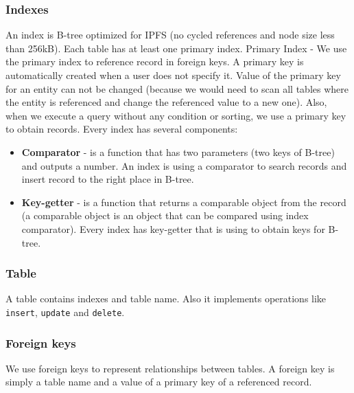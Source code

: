 \subsubsection{Indexes}
An index is B-tree optimized for IPFS (no cycled references and node size less than 256kB). Each table has at least one primary index. Primary Index - We use the primary index to reference record in foreign keys. A primary key is automatically created when a user does not specify it. Value of the primary key for an entity can not be changed (because we would need to scan all tables where the entity is referenced and change the referenced value to a new one). Also, when we execute a query without any condition or sorting, we use a primary key to obtain records. Every index has several components: 
\begin{itemize}
    \item \textbf{Comparator} - is a function that has two parameters (two keys of B-tree) and outputs a number. An index is using a comparator to search records and insert record to the right place in B-tree.
    \item \textbf{Key-getter} - is a function that returns a comparable object from the record (a comparable object is an object that can be compared using index comparator). Every index has key-getter that is using to obtain keys for B-tree.
\end{itemize}

\subsubsection{Table}
A table contains indexes and table name. Also it implements operations like \texttt{insert}, \texttt{update} and \texttt{delete}.

\subsubsection{Foreign keys}
We use foreign keys to represent relationships between tables. A foreign key is simply a table name and a value of a primary key of a referenced record.

